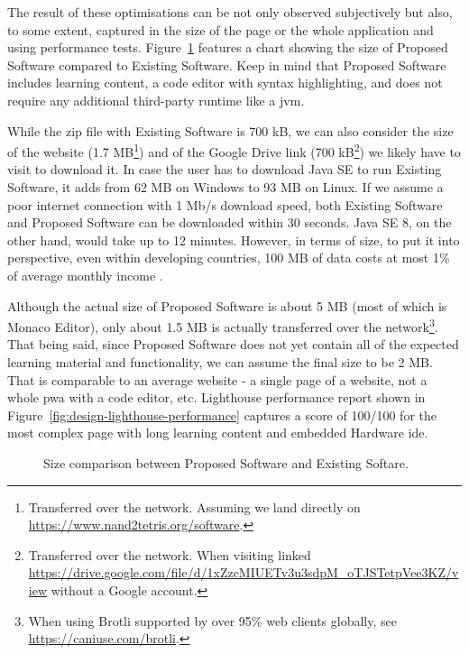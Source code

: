 The result of these optimisations can be not only observed subjectively but also, to some extent, captured in the size of the page or the whole application and using performance tests.
Figure~\ref{fig:design-size-comparison} features a chart showing the size of Proposed Software compared to Existing Software.
Keep in mind that Proposed Software includes learning content, a code editor with syntax highlighting, and does not require any additional third-party runtime like a \gls{jvm}.

While the zip file with Existing Software is 700 kB, we can also consider the size of the website (1.7 MB\footnote{Transferred over the network. Assuming we land directly on \url{https://www.nand2tetris.org/software}.}) and of the Google Drive link (700 kB\footnote{Transferred over the network. When visiting linked \url{https://drive.google.com/file/d/1xZzcMIUETv3u3sdpM_oTJSTetpVee3KZ/view} without a Google account.}) we likely have to visit to download it.
In case the user has to download Java SE to run Existing Software, it adds from 62 MB on Windows to 93 MB on Linux.
If we assume a poor internet connection with 1 Mb/s download speed, both Existing Software and Proposed Software can be downloaded within 30 seconds.
Java SE 8, on the other hand, would take up to 12 minutes.
However, in terms of size, to put it into perspective, even within developing countries, 100 MB of data costs at most 1\% of average monthly income \parencite{Rodriguez_2022}.

Although the actual size of Proposed Software is about 5 MB (most of which is Monaco Editor), only about 1.5 MB is actually transferred over the network\footnote{When using Brotli supported by over 95\% web clients globally, see \url{https://caniuse.com/brotli}.}.
That being said, since Proposed Software does not yet contain all of the expected learning material and functionality, we can assume the final size to be 2 MB.
That is comparable to an average website \parencite{Indigo_2022} - a single page of a website, not a whole \gls{pwa} with a code editor, etc.
Lighthouse performance report shown in Figure~\ref{fig:design-lighthouse-performance} captures a score of 100/100 for the most complex page with long learning content and embedded Hardware \gls{ide}.

\begin{figure}[H]
    \centering
    
    \caption{Size comparison between Proposed Software and Existing Softare.}
    \label{fig:design-size-comparison}
\end{figure}

